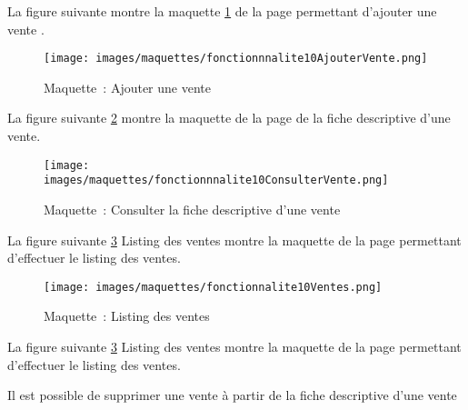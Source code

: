 La figure suivante montre la maquette \ref{maquette10-5} de la page permettant d'ajouter une vente .
\begin{figure}[H]
	\centering
	\texttt{[image: images/maquettes/fonctionnnalite10AjouterVente.png]}
	\caption{Maquette~: Ajouter une vente}
	\label{maquette10-5}
\end{figure}

La figure suivante \ref{maquette10-3} montre la maquette de la page de la fiche descriptive d'une vente.
\begin{figure}[H]
	\centering
	\texttt{[image: images/maquettes/fonctionnnalite10ConsulterVente.png]}
	\caption{Maquette~: Consulter la fiche descriptive d'une vente}
	\label{maquette10-3}
\end{figure}

La figure suivante \ref{maquette10-4} Listing des ventes montre la maquette de la page permettant d'effectuer le listing des ventes.
\begin{figure}[H]
	\centering
	\texttt{[image: images/maquettes/fonctionnalite10Ventes.png]}
	\caption{Maquette~: Listing des ventes}
	\label{maquette10-4}
\end{figure}

La figure suivante \ref{maquette10-4} Listing des ventes montre la maquette de la page permettant d'effectuer le listing des ventes.

Il est possible de supprimer une vente à partir de la fiche descriptive d'une vente 


